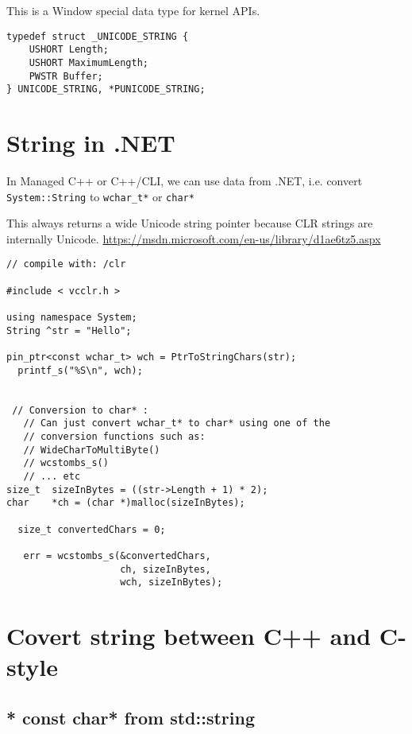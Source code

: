 This is a Window special data type for kernel APIs.
\begin{verbatim}
typedef struct _UNICODE_STRING {
    USHORT Length;
    USHORT MaximumLength;
    PWSTR Buffer;
} UNICODE_STRING, *PUNICODE_STRING;
\end{verbatim}



\section{String in .NET}

In Managed C++ or C++/CLI, we can use data from .NET, i.e. convert \verb!System::String! to \verb!wchar_t*! or \verb!char*!

This always returns a wide Unicode string pointer because CLR strings are internally Unicode. 
\url{https://msdn.microsoft.com/en-us/library/d1ae6tz5.aspx}

\begin{verbatim}
// compile with: /clr

#include < vcclr.h >

using namespace System;
String ^str = "Hello";

pin_ptr<const wchar_t> wch = PtrToStringChars(str);
  printf_s("%S\n", wch);
  
  
 // Conversion to char* :
   // Can just convert wchar_t* to char* using one of the 
   // conversion functions such as: 
   // WideCharToMultiByte()
   // wcstombs_s()
   // ... etc
size_t  sizeInBytes = ((str->Length + 1) * 2);
char    *ch = (char *)malloc(sizeInBytes);
 
  size_t convertedChars = 0;
  
   err = wcstombs_s(&convertedChars, 
                    ch, sizeInBytes,
                    wch, sizeInBytes);     
\end{verbatim}

\section{Covert string between C++ and C-style}
\label{sec:string_convert-C-C++}

\subsection{* const char* from std::string}



